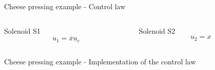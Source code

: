 \documentclass[presentation,aspectratio=1610]{beamer}
\renewcommand*{\not}[1]{\ensuremath{\bar{#1}}}
\renewcommand*{\not}[1]{\ensuremath{\overline{#1}}}
\begin{document}
\begin{frame}[label={sec:org4f9c0a5}]{Cheese pressing example - Control law}
\begin{columns}
\begin{column}{0.5\columnwidth}
\begin{block}{Solenoid S1}
\[u_1 = \not{x}u_c \]
\begin{LaTeX}
\begin{center}
\end{center}
\end{LaTeX}
\end{block}
\end{column}

\begin{column}{0.5\columnwidth}
\begin{block}{Solenoid S2}
\[u_2 = x \]
\begin{LaTeX}
\begin{center}
\end{center}
\end{LaTeX}
\end{block}
\end{column}
\end{columns}
\end{frame}


\begin{frame}[label={sec:org099ba24}]{Cheese pressing example - Implementation of the control law}
\begin{LaTeX}
\begin{center}
\end{center}
\end{LaTeX}
\end{frame}
\end{document}
